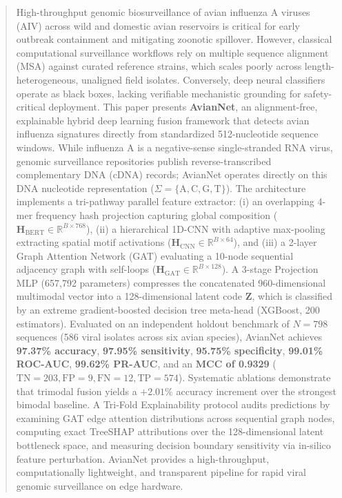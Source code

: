 \documentclass[conference]{IEEEtran}
\begin{document}
\begin{abstract}
High-throughput genomic biosurveillance of avian influenza A viruses (AIV) across wild and domestic avian reservoirs is critical for early outbreak containment and mitigating zoonotic spillover. However, classical computational surveillance workflows rely on multiple sequence alignment (MSA) against curated reference strains, which scales poorly across length-heterogeneous, unaligned field isolates. Conversely, deep neural classifiers operate as black boxes, lacking verifiable mechanistic grounding for safety-critical deployment. This paper presents \textbf{AvianNet}, an alignment-free, explainable hybrid deep learning fusion framework that detects avian influenza signatures directly from standardized 512-nucleotide sequence windows. While influenza A is a negative-sense single-stranded RNA virus, genomic surveillance repositories publish reverse-transcribed complementary DNA (cDNA) records; AvianNet operates directly on this DNA nucleotide representation ($\Sigma = \{\text{A}, \text{C}, \text{G}, \text{T}\}$). The architecture implements a tri-pathway parallel feature extractor: (i) an overlapping 4-mer frequency hash projection capturing global composition ($\mathbf{H}_{\text{BERT}} \in \mathbb{R}^{B \times 768}$), (ii) a hierarchical 1D-CNN with adaptive max-pooling extracting spatial motif activations ($\mathbf{H}_{\text{CNN}} \in \mathbb{R}^{B \times 64}$), and (iii) a 2-layer Graph Attention Network (GAT) evaluating a 10-node sequential adjacency graph with self-loops ($\mathbf{H}_{\text{GAT}} \in \mathbb{R}^{B \times 128}$). A 3-stage Projection MLP (657,792 parameters) compresses the concatenated 960-dimensional multimodal vector into a 128-dimensional latent code $\mathbf{Z}$, which is classified by an extreme gradient-boosted decision tree meta-head (XGBoost, 200 estimators). Evaluated on an independent holdout benchmark of $N = 798$ sequences (586 viral isolates across six avian species), AvianNet achieves \textbf{97.37\% accuracy}, \textbf{97.95\% sensitivity}, \textbf{95.75\% specificity}, \textbf{99.01\% ROC-AUC}, \textbf{99.62\% PR-AUC}, and an \textbf{MCC of 0.9329} ($\text{TN}=203, \text{FP}=9, \text{FN}=12, \text{TP}=574$). Systematic ablations demonstrate that trimodal fusion yields a $+2.01\%$ accuracy increment over the strongest bimodal baseline. A Tri-Fold Explainability protocol audits predictions by examining GAT edge attention distributions across sequential graph nodes, computing exact TreeSHAP attributions over the 128-dimensional latent bottleneck space, and measuring decision boundary sensitivity via in-silico feature perturbation. AvianNet provides a high-throughput, computationally lightweight, and transparent pipeline for rapid viral genomic surveillance on edge hardware.
\end{abstract}
\end{document}

